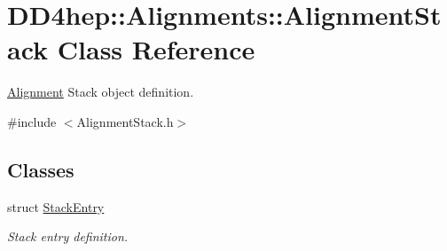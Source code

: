 \hypertarget{class_d_d4hep_1_1_alignments_1_1_alignment_stack}{}\section{D\+D4hep\+:\+:Alignments\+:\+:Alignment\+Stack Class Reference}
\label{class_d_d4hep_1_1_alignments_1_1_alignment_stack}


\hyperlink{class_d_d4hep_1_1_alignments_1_1_alignment}{Alignment} Stack object definition.  




{\ttfamily \#include $<$Alignment\+Stack.\+h$>$}

\subsection*{Classes}
\begin{DoxyCompactItemize}
\item 
struct \hyperlink{struct_d_d4hep_1_1_alignments_1_1_alignment_stack_1_1_stack_entry}{Stack\+Entry}
\begin{DoxyCompactList}\small\item\em Stack entry definition. \end{DoxyCompactList}\end{DoxyCompactItemize}
